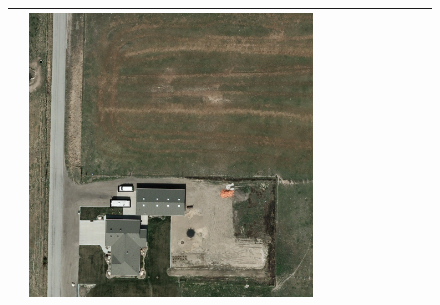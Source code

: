 \begin{figure}[h!]
\begin{tabularx}{\textwidth}{c|*{9}{X}}
    & \includegraphics[trim={300pt 355pt 610pt 570pt},clip,width=\linewidth]{images/015Results/01abb_vs_obb/comp_images/ground_truth_abb/198.png} \\ \hline


\end{tabularx}
\end{figure}
